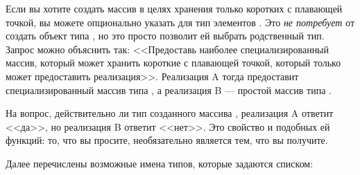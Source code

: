 Если вы хотите создать массив в целях хранения только коротких с плавающей
точкой, вы можете опционально указать для  тип элементов
. Это \emph{не потребует} от  создать объект типа
, но это просто позволит ей выбрать родственный тип. Запрос
можно объяснить так: <<Предоставь наиболее специализированный массив, который
может хранить короткие с плавающей точкой, который только может предоставить
реализация>>. Реализация A тогда предоставит специализированный массив типа
, а реализация B --- простой массив типа .

На вопрос, действительно ли тип созданного массива ,
реализация A ответит <<да>>, но реализация B ответит <<нет>>. Это свойство
 и подобных ей функций: то, что вы просите, необязательно
является тем, что вы получите.

Далее перечислены возможные имена типов, которые задаются списком:

